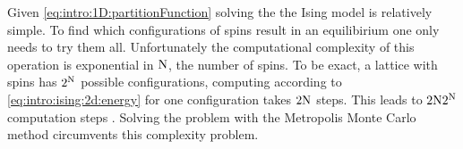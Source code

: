 	Given \cref{eq:intro:1D:partitionFunction} solving the the Ising model is relatively simple. To find which configurations of spins result in an equilibirium one only needs to try them all. Unfortunately the computational complexity of this operation is exponential in $\mathrm{N}$, the number of spins. To be exact, a lattice with \numberOfSpins spins has $2^\mathrm{N}$ possible configurations, computing \energy according to \cref{eq:intro:ising:2d:energy} for one configuration takes $2\mathrm{N}$ steps. This leads to $2\mathrm{N}2^\mathrm{N}$ computation steps \cite{kenzel1997physics}. Solving the problem with the Metropolis Monte Carlo method circumvents this complexity problem. 